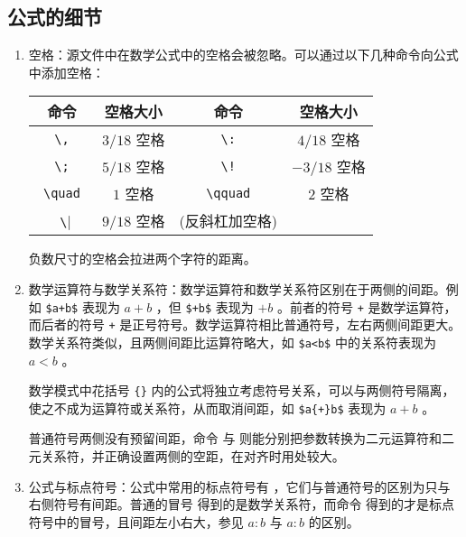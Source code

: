 \subsection{公式的细节}
\begin{enumerate}

\item 空格：源文件中在数学公式中的空格会被忽略。可以通过以下几种命令向公式中添加空格：

\begin{tcolorbox}[colback=white]
\begin{center}
\begin{tabular}{cccc}
    命令 & 空格大小 & 命令 & 空格大小\\
\hline
    \verb| \, | & $3/18$ 空格 & \verb| \: | & $4/18$ 空格\\
    \verb| \; | & $5/18$ 空格 & \verb| \! | & $-3/18$ 空格\\
    \verb| \quad | & $1$ 空格 & \verb| \qquad | & $2$ 空格\\
    \verb| \|\texttt{\textvisiblespace} & $9/18$ 空格 & (反斜杠加空格)  & \\
\end{tabular}
\end{center} 
\end{tcolorbox}

负数尺寸的空格会拉进两个字符的距离。

\item 数学运算符与数学关系符：数学运算符和数学关系符区别在于两侧的间距。例如 \verb|$a+b$| 表现为 $a+b$ ，但 \verb|$+b$| 表现为 $+b$ 。前者的符号 \verb|+| 是数学运算符，而后者的符号 \verb|+| 是正号符号。数学运算符相比普通符号，左右两侧间距更大。数学关系符类似，且两侧间距比运算符略大，如 \verb|$a<b$| 中的关系符表现为 $a<b$ 。

数学模式中花括号 \verb|{}| 内的公式将独立考虑符号关系，可以与两侧符号隔离，使之不成为运算符或关系符，从而取消间距，如 \verb|$a{+}b$| 表现为 $a{+}b$ 。

普通符号两侧没有预留间距，命令 \boxforcmd{\\mathbin{}} 与 \boxforcmd{\\mathrel{}} 则能分别把参数转换为二元运算符和二元关系符，并正确设置两侧的空距，在对齐时用处较大。

\item 公式与标点符号：公式中常用的标点符号有 \boxforcmd{,;} ，它们与普通符号的区别为只与右侧符号有间距。普通的冒号 \boxforcmd{:} 得到的是数学关系符，而命令 \boxforcmd{\\colon} 得到的才是标点符号中的冒号，且间距左小右大，参见  $a:b$ 与  $a \colon b$ 的区别。


\end{enumerate}
